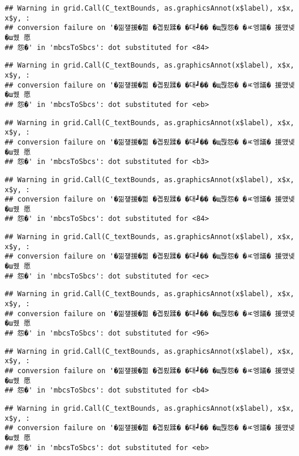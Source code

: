 \documentclass[
]{article}
\begin{document}
\begin{verbatim}
## Warning in grid.Call(C_textBounds, as.graphicsAnnot(x$label), x$x, x$y, :
## conversion failure on '�낆쟾援�쁾 �곕룄蹂� �대┛�� �щ쭩怨� �ㅼ엥議� 援먰넻�ш퀬 愿
## 怨�' in 'mbcsToSbcs': dot substituted for <84>
\end{verbatim}

\begin{verbatim}
## Warning in grid.Call(C_textBounds, as.graphicsAnnot(x$label), x$x, x$y, :
## conversion failure on '�낆쟾援�쁾 �곕룄蹂� �대┛�� �щ쭩怨� �ㅼ엥議� 援먰넻�ш퀬 愿
## 怨�' in 'mbcsToSbcs': dot substituted for <eb>
\end{verbatim}

\begin{verbatim}
## Warning in grid.Call(C_textBounds, as.graphicsAnnot(x$label), x$x, x$y, :
## conversion failure on '�낆쟾援�쁾 �곕룄蹂� �대┛�� �щ쭩怨� �ㅼ엥議� 援먰넻�ш퀬 愿
## 怨�' in 'mbcsToSbcs': dot substituted for <b3>
\end{verbatim}

\begin{verbatim}
## Warning in grid.Call(C_textBounds, as.graphicsAnnot(x$label), x$x, x$y, :
## conversion failure on '�낆쟾援�쁾 �곕룄蹂� �대┛�� �щ쭩怨� �ㅼ엥議� 援먰넻�ш퀬 愿
## 怨�' in 'mbcsToSbcs': dot substituted for <84>
\end{verbatim}

\begin{verbatim}
## Warning in grid.Call(C_textBounds, as.graphicsAnnot(x$label), x$x, x$y, :
## conversion failure on '�낆쟾援�쁾 �곕룄蹂� �대┛�� �щ쭩怨� �ㅼ엥議� 援먰넻�ш퀬 愿
## 怨�' in 'mbcsToSbcs': dot substituted for <ec>
\end{verbatim}

\begin{verbatim}
## Warning in grid.Call(C_textBounds, as.graphicsAnnot(x$label), x$x, x$y, :
## conversion failure on '�낆쟾援�쁾 �곕룄蹂� �대┛�� �щ쭩怨� �ㅼ엥議� 援먰넻�ш퀬 愿
## 怨�' in 'mbcsToSbcs': dot substituted for <96>
\end{verbatim}

\begin{verbatim}
## Warning in grid.Call(C_textBounds, as.graphicsAnnot(x$label), x$x, x$y, :
## conversion failure on '�낆쟾援�쁾 �곕룄蹂� �대┛�� �щ쭩怨� �ㅼ엥議� 援먰넻�ш퀬 愿
## 怨�' in 'mbcsToSbcs': dot substituted for <b4>
\end{verbatim}

\begin{verbatim}
## Warning in grid.Call(C_textBounds, as.graphicsAnnot(x$label), x$x, x$y, :
## conversion failure on '�낆쟾援�쁾 �곕룄蹂� �대┛�� �щ쭩怨� �ㅼ엥議� 援먰넻�ш퀬 愿
## 怨�' in 'mbcsToSbcs': dot substituted for <eb>
\end{verbatim}
\end{document}
